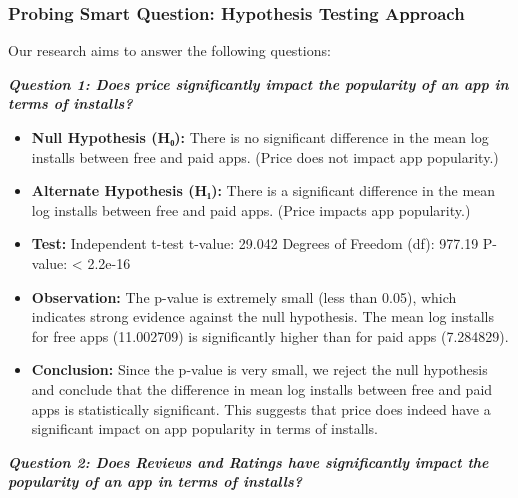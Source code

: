 \documentclass[
]{article}
\begin{document}
\subsubsection{Probing Smart Question: Hypothesis Testing
Approach}\label{probing-smart-question-hypothesis-testing-approach}

Our research aims to answer the following questions:

\textbf{\emph{Question 1: Does price significantly impact the popularity
of an app in terms of installs?}}

\begin{itemize}
\item
  \textbf{Null Hypothesis (H₀):} There is no significant difference in
  the mean log installs between free and paid apps. (Price does not
  impact app popularity.)
\item
  \textbf{Alternate Hypothesis (H₁):} There is a significant difference
  in the mean log installs between free and paid apps. (Price impacts
  app popularity.)
\item
  \textbf{Test:} Independent t-test t-value: 29.042 Degrees of Freedom
  (df): 977.19 P-value: \textless{} 2.2e-16
\item
  \textbf{Observation:} The p-value is extremely small (less than 0.05),
  which indicates strong evidence against the null hypothesis. The mean
  log installs for free apps (11.002709) is significantly higher than
  for paid apps (7.284829).
\item
  \textbf{Conclusion:} Since the p-value is very small, we reject the
  null hypothesis and conclude that the difference in mean log installs
  between free and paid apps is statistically significant. This suggests
  that price does indeed have a significant impact on app popularity in
  terms of installs.
\end{itemize}

\textbf{\emph{Question 2: Does Reviews and Ratings have significantly
impact the popularity of an app in terms of installs?}}
\end{document}
